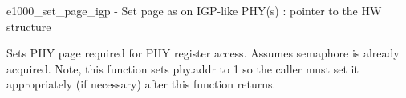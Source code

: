 e1000\+\_\+set\+\_\+page\+\_\+igp -\/ Set page as on I\+G\+P-\/like P\+H\+Y(s) \+: pointer to the HW structure

Sets P\+HY page required for P\+HY register access. Assumes semaphore is already acquired. Note, this function sets phy.\+addr to 1 so the caller must set it appropriately (if necessary) after this function returns. 